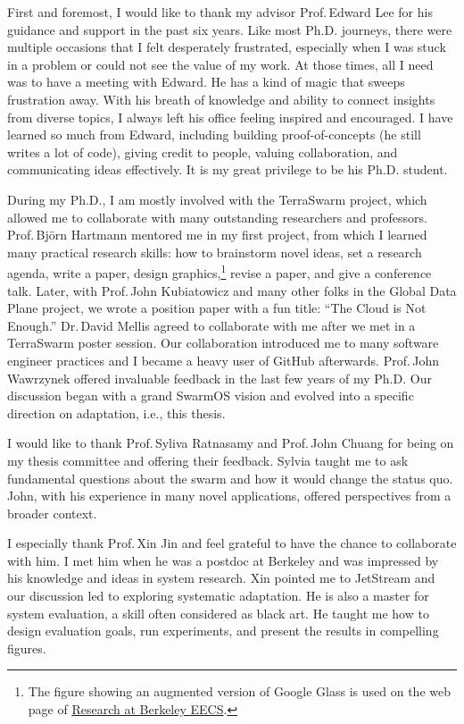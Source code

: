 \documentclass[thesis.tex]{subfiles}
\begin{document}
\begin{acknowledgements}

  First and foremost, I would like to thank my advisor Prof.\,Edward Lee for his
  guidance and support in the past six years. Like most Ph.D. journeys, there
  were multiple occasions that I felt desperately frustrated, especially when I
  was stuck in a problem or could not see the value of my work. At those times,
  all I need was to have a meeting with Edward. He has a kind of magic that
  sweeps frustration away. With his breath of knowledge and ability to connect
  insights from diverse topics, I always left his office feeling inspired and
  encouraged. I have learned so much from Edward, including building
  proof-of-concepts (he still writes a lot of code), giving credit to people,
  valuing collaboration, and communicating ideas effectively. It is my great
  privilege to be his Ph.D. student.

  During my Ph.D., I am mostly involved with the TerraSwarm project, which
  allowed me to collaborate with many outstanding researchers and
  professors. Prof.\,Bj\"orn Hartmann mentored me in my first project, from
  which I learned many practical research skills: how to brainstorm novel ideas,
  set a research agenda, write a paper, design graphics,\footnote{The figure
    showing an augmented version of Google Glass is used on the web page of
    \href{https://eecs.berkeley.edu/research}{Research at Berkeley EECS}.}
  revise a paper, and give a conference talk. Later, with Prof.\,John
  Kubiatowicz and many other folks in the Global Data Plane project, we wrote a
  position paper with a fun title: ``The Cloud is Not Enough.'' Dr.\,David
  Mellis agreed to collaborate with me after we met in a TerraSwarm poster
  session. Our collaboration introduced me to many software engineer practices
  and I became a heavy user of GitHub afterwards. Prof.\,John Wawrzynek offered
  invaluable feedback in the last few years of my Ph.D. Our discussion began
  with a grand SwarmOS vision and evolved into a specific direction on
  adaptation, i.e., this thesis.

  I would like to thank Prof.\,Syliva Ratnasamy and Prof.\,John Chuang for being
  on my thesis committee and offering their feedback. Sylvia taught me to ask
  fundamental questions about the swarm and how it would change the status
  quo. John, with his experience in many novel applications, offered
  perspectives from a broader context.

  I especially thank Prof.\,Xin Jin and feel grateful to have the chance to
  collaborate with him. I met him when he was a postdoc at Berkeley and was
  impressed by his knowledge and ideas in system research. Xin pointed me to
  JetStream and our discussion led to exploring systematic adaptation. He is
  also a master for system evaluation, a skill often considered as black art. He
  taught me how to design evaluation goals, run experiments, and present the
  results in compelling figures.


\end{acknowledgements}
\end{document}
